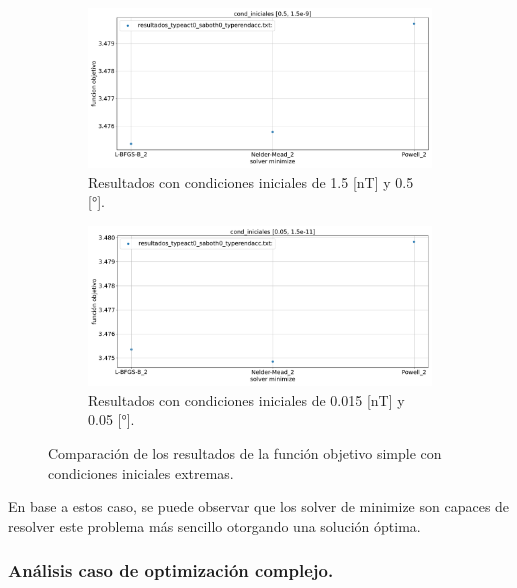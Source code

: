 \begin{figure}[h!]
	\centering
	\begin{subfigure}[b]{0.8\textwidth}
		\centering
		\includegraphics[width=\textwidth]{cond_iniciales_0.5_1.5e-9.pdf}
		\caption{Resultados con condiciones iniciales de 1.5 [nT] y 0.5 [°].}
		\label{fig:acc_cond_inic_3}
	\end{subfigure}
	\hfill
	\begin{subfigure}[b]{0.8\textwidth}
		\centering
		\includegraphics[width=\textwidth]{cond_iniciales_0.05_1.5e-11.pdf}
		\caption{Resultados con condiciones iniciales de 0.015 [nT] y 0.05 [°].}
		\label{fig:acc_cond_inic_4}
	\end{subfigure}
	\caption{Comparación de los resultados de la función objetivo simple con condiciones iniciales extremas.}
	\label{fig:acc_cond_inic_comparacion_ext}
\end{figure}

En base a estos caso, se puede observar que los solver de minimize son capaces de resolver este problema más sencillo otorgando una solución óptima.

\subsubsection{Análisis caso de optimización complejo.}

